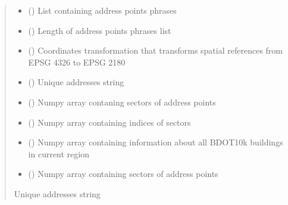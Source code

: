 \documentclass[letterpaper,10pt,english]{sphinxmanual}
\begin{document}
\begin{fulllineitems}
\begin{quote}
\begin{description}
\begin{itemize}
\item {} 
\sphinxAtStartPar
{} (\sphinxcode{\sphinxupquote{List}}{[}\sphinxcode{\sphinxupquote{str}}{]}) \textendash{} List containing address points phrases

\item {} 
\sphinxAtStartPar
{} () \textendash{} Length of address points phrases list

\item {} 
\sphinxAtStartPar
{} () \textendash{} Coordinates transformation that transforms spatial references from EPSG 4326 to EPSG 2180

\item {} 
\sphinxAtStartPar
{} () \textendash{} Unique addresses string

\item {} 
\sphinxAtStartPar
{} () \textendash{} Numpy array contaning sectors of address points

\item {} 
\sphinxAtStartPar
{} () \textendash{} Numpy array containing indices of sectors

\item {} 
\sphinxAtStartPar
{} () \textendash{} Numpy array containing information about all BDOT10k buildings in current region

\item {} 
\sphinxAtStartPar
{} () \textendash{} Numpy array containing sectors of address points

\end{itemize}

\sphinxAtStartPar
{}

\sphinxAtStartPar
Unique addresses string

\end{description}\end{quote}

\end{fulllineitems}
\end{document}
